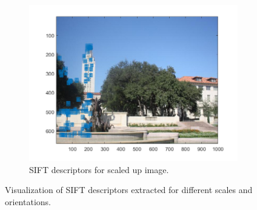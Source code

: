 \documentclass{article}
\begin{document}
\begin{figure}[!htb]
\begin{subfigure}{.9\textwidth}
  \centering
  \includegraphics[width=.99\textwidth]{uttower2_scaledup_sift.png}
  \caption{SIFT descriptors for scaled up image.}
\end{subfigure}
\caption{Visualization of SIFT descriptors extracted for different scales and orientations.}
\end{figure}

\newpage
\end{document}
